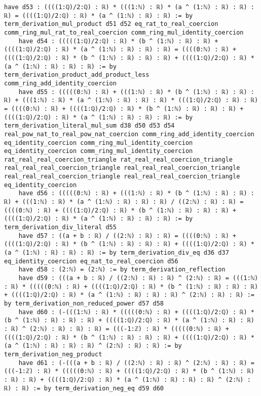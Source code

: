 \documentclass{article}
\begin{document}
\begin{tcolorbox}[colback=white!10, width=\linewidth]
\begin{lstlisting}[language=Lean4]
    have d53 : ((((1:ℚ)/2:ℚ) : ℝ) * (((1:ℕ) : ℝ) * (a ^ (1:ℕ) : ℝ) : ℝ) : ℝ) = ((((1:ℚ)/2:ℚ) : ℝ) * (a ^ (1:ℕ) : ℝ) : ℝ) := by term_derivation_mul_product d51 d52 eq_rat_to_real_coercion comm_ring_mul_rat_to_real_coercion comm_ring_mul_identity_coercion
    have d54 : (((((1:ℚ)/2:ℚ) : ℝ) * (b ^ (1:ℕ) : ℝ) : ℝ) + ((((1:ℚ)/2:ℚ) : ℝ) * (a ^ (1:ℕ) : ℝ) : ℝ) : ℝ) = ((((0:ℕ) : ℝ) + ((((1:ℚ)/2:ℚ) : ℝ) * (b ^ (1:ℕ) : ℝ) : ℝ) : ℝ) + ((((1:ℚ)/2:ℚ) : ℝ) * (a ^ (1:ℕ) : ℝ) : ℝ) : ℝ) := by term_derivation_product_add_product_less comm_ring_add_identity_coercion
    have d55 : (((((0:ℕ) : ℝ) + (((1:ℕ) : ℝ) * (b ^ (1:ℕ) : ℝ) : ℝ) : ℝ) + (((1:ℕ) : ℝ) * (a ^ (1:ℕ) : ℝ) : ℝ) : ℝ) * (((1:ℚ)/2:ℚ) : ℝ) : ℝ) = ((((0:ℕ) : ℝ) + ((((1:ℚ)/2:ℚ) : ℝ) * (b ^ (1:ℕ) : ℝ) : ℝ) : ℝ) + ((((1:ℚ)/2:ℚ) : ℝ) * (a ^ (1:ℕ) : ℝ) : ℝ) : ℝ) := by term_derivation_literal_mul_sum d38 d50 d53 d54 real_pow_nat_to_real_pow_nat_coercion comm_ring_add_identity_coercion eq_identity_coercion comm_ring_mul_identity_coercion eq_identity_coercion comm_ring_mul_identity_coercion rat_real_real_coercion_triangle rat_real_real_coercion_triangle real_real_real_coercion_triangle real_real_real_coercion_triangle real_real_real_coercion_triangle real_real_real_coercion_triangle eq_identity_coercion
    have d56 : (((((0:ℕ) : ℝ) + (((1:ℕ) : ℝ) * (b ^ (1:ℕ) : ℝ) : ℝ) : ℝ) + (((1:ℕ) : ℝ) * (a ^ (1:ℕ) : ℝ) : ℝ) : ℝ) / ((2:ℕ) : ℝ) : ℝ) = ((((0:ℕ) : ℝ) + ((((1:ℚ)/2:ℚ) : ℝ) * (b ^ (1:ℕ) : ℝ) : ℝ) : ℝ) + ((((1:ℚ)/2:ℚ) : ℝ) * (a ^ (1:ℕ) : ℝ) : ℝ) : ℝ) := by term_derivation_div_literal d55
    have d57 : ((a + b : ℝ) / ((2:ℕ) : ℝ) : ℝ) = ((((0:ℕ) : ℝ) + ((((1:ℚ)/2:ℚ) : ℝ) * (b ^ (1:ℕ) : ℝ) : ℝ) : ℝ) + ((((1:ℚ)/2:ℚ) : ℝ) * (a ^ (1:ℕ) : ℝ) : ℝ) : ℝ) := by term_derivation_div_eq d36 d37 eq_identity_coercion eq_nat_to_real_coercion d56
    have d58 : (2:ℕ) = (2:ℕ) := by term_derivation_reflection
    have d59 : (((a + b : ℝ) / ((2:ℕ) : ℝ) : ℝ) ^ (2:ℕ) : ℝ) = (((1:ℕ) : ℝ) * (((((0:ℕ) : ℝ) + ((((1:ℚ)/2:ℚ) : ℝ) * (b ^ (1:ℕ) : ℝ) : ℝ) : ℝ) + ((((1:ℚ)/2:ℚ) : ℝ) * (a ^ (1:ℕ) : ℝ) : ℝ) : ℝ) ^ (2:ℕ) : ℝ) : ℝ) := by term_derivation_non_reduced_power d57 d58
    have d60 : (-(((1:ℕ) : ℝ) * (((((0:ℕ) : ℝ) + ((((1:ℚ)/2:ℚ) : ℝ) * (b ^ (1:ℕ) : ℝ) : ℝ) : ℝ) + ((((1:ℚ)/2:ℚ) : ℝ) * (a ^ (1:ℕ) : ℝ) : ℝ) : ℝ) ^ (2:ℕ) : ℝ) : ℝ) : ℝ) = (((-1:ℤ) : ℝ) * (((((0:ℕ) : ℝ) + ((((1:ℚ)/2:ℚ) : ℝ) * (b ^ (1:ℕ) : ℝ) : ℝ) : ℝ) + ((((1:ℚ)/2:ℚ) : ℝ) * (a ^ (1:ℕ) : ℝ) : ℝ) : ℝ) ^ (2:ℕ) : ℝ) : ℝ) := by term_derivation_neg_product
    have d61 : (-(((a + b : ℝ) / ((2:ℕ) : ℝ) : ℝ) ^ (2:ℕ) : ℝ) : ℝ) = (((-1:ℤ) : ℝ) * (((((0:ℕ) : ℝ) + ((((1:ℚ)/2:ℚ) : ℝ) * (b ^ (1:ℕ) : ℝ) : ℝ) : ℝ) + ((((1:ℚ)/2:ℚ) : ℝ) * (a ^ (1:ℕ) : ℝ) : ℝ) : ℝ) ^ (2:ℕ) : ℝ) : ℝ) := by term_derivation_neg_eq d59 d60

\end{lstlisting}
\end{tcolorbox}
\end{document}
